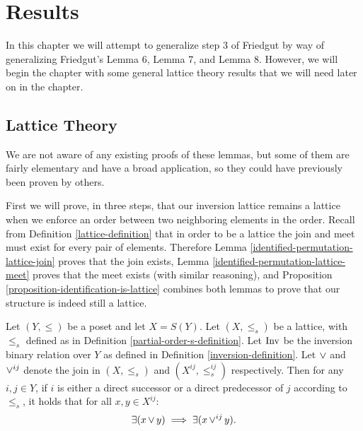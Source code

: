 
\chapter{Results}

	In this chapter we will attempt to generalize step 3 of Friedgut by way of generalizing Friedgut's Lemma 6, Lemma 7, and Lemma 8. However, we will begin the chapter with some general lattice theory results that we will need later on in the chapter.

\section{Lattice Theory}

	We are not aware of any existing proofs of these lemmas, but some of them are fairly elementary and have a broad application, so they could have previously been proven by others.

	First we will prove, in three steps, that our inversion lattice remains a lattice when we enforce an order between two neighboring elements in the order. Recall from Definition \ref{lattice-definition} that in order to be a lattice the join and meet must exist for every pair of elements. Therefore Lemma \ref{identified-permutation-lattice-join} proves that the join exists, Lemma \ref{identified-permutation-lattice-meet} proves that the meet exists (with similar reasoning), and Proposition \ref{proposition-identification-is-lattice} combines both lemmas to prove that our structure is indeed still a lattice.

	\begin{lemma}
		\label{identified-permutation-lattice-join}
		Let $(Y, \le)$ be a poset and let $X = S(Y)$. Let $(X, \le_s)$ be a lattice, with $\le_s$ defined as in Definition \ref{partial-order-s-definition}. Let $\operatorname{Inv}$ be the inversion binary relation over $Y$ as defined in Definition \ref{inversion-definition}. Let $\operatorname{\vee}$ and $\operatorname{\vee}^{ij}$ denote the join in $(X, \le_s)$ and $(X^{ij}, \le^{ij}_s)$ respectively. Then for any $i,j \in Y$, if $i$ is either a direct successor or a direct predecessor of $j$ according to $\le_s$, it holds that for all $x, y \in X^{ij}$:
		\[
			\exists(x \operatorname{\vee} y) \implies \exists(x \operatorname{\vee}^{ij} y).
		\]
	\end{lemma}

